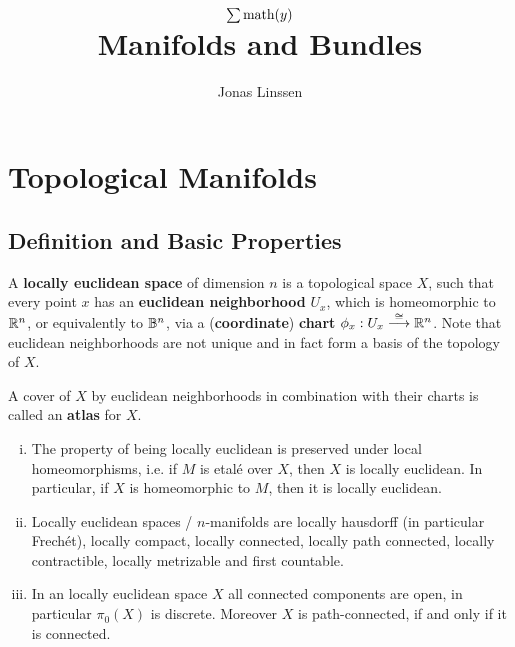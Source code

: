 

\title{
	$\sum \text{math}(y)$\\
	Manifolds and Bundles
}
\author{Jonas Linssen}


	\maketitle
	\tableofcontents

	\newpage
	\section{Topological Manifolds}
	\subsection{Definition and Basic Properties}

	\begin{definition}
		A \textbf{locally euclidean space} of dimension $n$ is a topological space $X$, such that every point $x$ has an  \textbf{euclidean neighborhood} $U_x$, which is homeomorphic to $\mathbb{R}^n$, or equivalently to $\mathbb{B}^n$, via a (\textbf{coordinate}) \textbf{chart} $\phi_x:U_x \overset{\cong}{-->} \mathbb{R}^n$. Note that euclidean neighborhoods are not unique and in fact form a basis of the topology of $X$. 

		A cover of $X$ by euclidean neighborhoods in combination with their charts is called an \textbf{atlas} for $X$.
	\end{definition}

	\begin{remark}
	\end{remark}

	\begin{lemma}
		\vspace{-1.5em}
		\begin{enumerate}[(i)]
			\item{
				The property of being locally euclidean is preserved under local homeomorphisms, i.e. if $M$ is etalé over $X$, then $X$ is locally euclidean. In particular, if $X$ is homeomorphic to $M$, then it is locally euclidean.
			}
			\item{
				Locally euclidean spaces / $n$-manifolds are locally hausdorff (in particular Frechét), locally compact, locally connected, locally path connected, locally contractible, locally metrizable and first countable.
			}
			\item{
				In an locally euclidean space $X$ all connected components are open, in particular $\pi_0(X)$ is discrete. Moreover $X$ is path-connected, if and only if it is connected.
			}
		\end{enumerate}
	\end{lemma}

